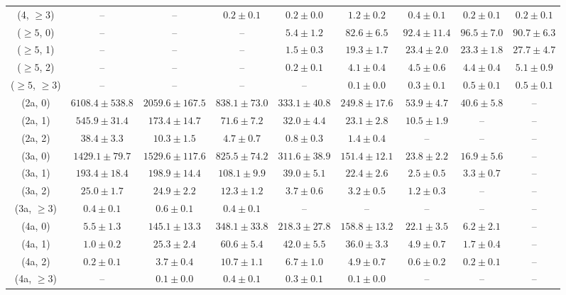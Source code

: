 \begin{table}[h!]
{\begin{tabular}{ccccccccc}
	(4, $\ge3$) & -- & -- & $0.2\pm 0.1$ & $0.2\pm 0.0$ & $1.2\pm 0.2$ & $0.4\pm 0.1$ & $0.2\pm 0.1$ & $0.2\pm 0.1$ \\[0.5ex] 
	($\ge5$, 0) & -- & -- & -- & $5.4\pm 1.2$ & $82.6\pm 6.5$ & $92.4\pm 11.4$ & $96.5\pm 7.0$ & $90.7\pm 6.3$ \\[0.5ex] 
	($\ge5$, 1) & -- & -- & -- & $1.5\pm 0.3$ & $19.3\pm 1.7$ & $23.4\pm 2.0$ & $23.3\pm 1.8$ & $27.7\pm 4.7$ \\[0.5ex] 
	($\ge5$, 2) & -- & -- & -- & $0.2\pm 0.1$ & $4.1\pm 0.4$ & $4.5\pm 0.6$ & $4.4\pm 0.4$ & $5.1\pm 0.9$ \\[0.5ex] 
	($\ge5$, $\ge3$) & -- & -- & -- & -- & $0.1\pm 0.0$ & $0.3\pm 0.1$ & $0.5\pm 0.1$ & $0.5\pm 0.1$ \\[0.5ex] 
	(2a, 0) & $6108.4\pm 538.8$ & $2059.6\pm 167.5$ & $838.1\pm 73.0$ & $333.1\pm 40.8$ & $249.8\pm 17.6$ & $53.9\pm 4.7$ & $40.6\pm 5.8$ & -- \\[0.5ex] 
	(2a, 1) & $545.9\pm 31.4$ & $173.4\pm 14.7$ & $71.6\pm 7.2$ & $32.0\pm 4.4$ & $23.1\pm 2.8$ & $10.5\pm 1.9$ & -- & -- \\[0.5ex] 
	(2a, 2) & $38.4\pm 3.3$ & $10.3\pm 1.5$ & $4.7\pm 0.7$ & $0.8\pm 0.3$ & $1.4\pm 0.4$ & -- & -- & -- \\[0.5ex] 
	(3a, 0) & $1429.1\pm 79.7$ & $1529.6\pm 117.6$ & $825.5\pm 74.2$ & $311.6\pm 38.9$ & $151.4\pm 12.1$ & $23.8\pm 2.2$ & $16.9\pm 5.6$ & -- \\[0.5ex] 
	(3a, 1) & $193.4\pm 18.4$ & $198.9\pm 14.4$ & $108.1\pm 9.9$ & $39.0\pm 5.1$ & $22.4\pm 2.6$ & $2.5\pm 0.5$ & $3.3\pm 0.7$ & -- \\[0.5ex] 
	(3a, 2) & $25.0\pm 1.7$ & $24.9\pm 2.2$ & $12.3\pm 1.2$ & $3.7\pm 0.6$ & $3.2\pm 0.5$ & $1.2\pm 0.3$ & -- & -- \\[0.5ex] 
	(3a, $\ge3$) & $0.4\pm 0.1$ & $0.6\pm 0.1$ & $0.4\pm 0.1$ & -- & -- & -- & -- & -- \\[0.5ex] 
	(4a, 0) & $5.5\pm 1.3$ & $145.1\pm 13.3$ & $348.1\pm 33.8$ & $218.3\pm 27.8$ & $158.8\pm 13.2$ & $22.1\pm 3.5$ & $6.2\pm 2.1$ & -- \\[0.5ex] 
	(4a, 1) & $1.0\pm 0.2$ & $25.3\pm 2.4$ & $60.6\pm 5.4$ & $42.0\pm 5.5$ & $36.0\pm 3.3$ & $4.9\pm 0.7$ & $1.7\pm 0.4$ & -- \\[0.5ex] 
	(4a, 2) & $0.2\pm 0.1$ & $3.7\pm 0.4$ & $10.7\pm 1.1$ & $6.7\pm 1.0$ & $4.9\pm 0.7$ & $0.6\pm 0.2$ & $0.2\pm 0.1$ & -- \\[0.5ex] 
	(4a, $\ge3$) & -- & $0.1\pm 0.0$ & $0.4\pm 0.1$ & $0.3\pm 0.1$ & $0.1\pm 0.0$ & -- & -- & -- \\[0.5ex] 

\end{tabular}}
\end{table}
